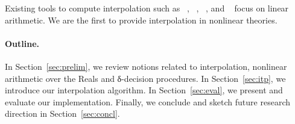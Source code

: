 Existing tools to compute interpolation such as
\mathsat~\cite{mathsat5},
\princess~\cite{DBLP:conf/cade/BrilloutKRW10},
\smtinterpol~\cite{DBLP:conf/spin/ChristHN12}, and
\zthree~\cite{DBLP:conf/fmcad/McMillan11}
focus on linear arithmetic.
We are the first to provide interpolation in nonlinear theories.


\paragraph{Outline.}
In Section~\ref{sec:prelim}, we review notions related to interpolation, nonlinear arithmetic over the Reals and δ-decision procedures.
In Section~\ref{sec:itp}, we introduce our interpolation algorithm.
In Section~\ref{sec:eval}, we present and evaluate our implementation.
Finally, we conclude and sketch future research direction in Section~\ref{sec:concl}.



